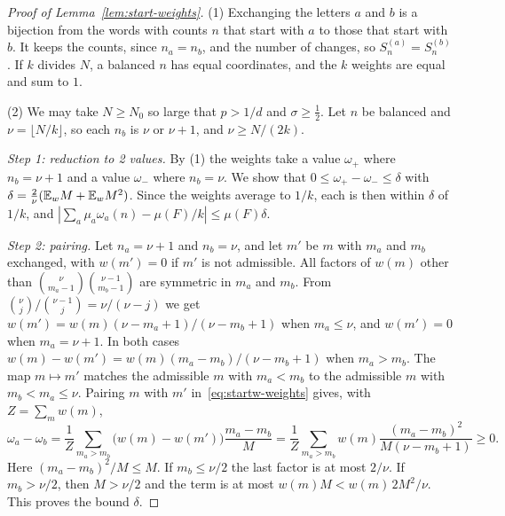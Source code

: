 \begin{proof}[Proof of Lemma~\ref{lem:start-weights}]
(1) Exchanging the letters $a$ and $b$ is a bijection from the words with counts
$n$ that start with $a$ to those that start with $b$. It keeps the counts, since
$n_a=n_b$, and the number of changes, so $S^{(a)}_n=S^{(b)}_n$. If $k$ divides
$N$, a balanced $n$ has equal coordinates, and the $k$ weights are equal and sum
to $1$.

(2) We may take $N\ge N_0$ so large that $p>1/d$ and $\sigma\ge\frac12$. Let $n$
be balanced and $\nu=\lfloor N/k\rfloor$, so each $n_b$ is $\nu$ or $\nu+1$, and
$\nu\ge N/(2k)$.

\emph{Step 1: reduction to 2 values.} By (1) the weights take a value $\omega_+$
where $n_b=\nu+1$ and a value $\omega_-$ where $n_b=\nu$. We show that
$0\le\omega_+-\omega_-\le\delta$ with $\delta=\frac2\nu(\mathbb E_wM+\mathbb E_wM^2)$. Since
the weights average to $1/k$, each is then within $\delta$ of $1/k$, and
$|\sum_a\mu_a\omega_a(n)-\mu(F)/k|\le\mu(F)\delta$.

\emph{Step 2: pairing.} Let $n_a=\nu+1$ and $n_b=\nu$, and let $m'$ be $m$ with
$m_a$ and $m_b$ exchanged, with $w(m')=0$ if $m'$ is not admissible. All factors
of $w(m)$ other than $\binom{\nu}{m_a-1}\binom{\nu-1}{m_b-1}$ are symmetric in
$m_a$ and $m_b$. From $\binom\nu j/\binom{\nu-1}j=\nu/(\nu-j)$ we get
$w(m')=w(m)(\nu-m_a+1)/(\nu-m_b+1)$ when $m_a\le\nu$, and $w(m')=0$ when
$m_a=\nu+1$. In both cases $w(m)-w(m')=w(m)(m_a-m_b)/(\nu-m_b+1)$ when
$m_a>m_b$. The map $m\mapsto m'$ matches the admissible $m$ with $m_a<m_b$ to
the admissible $m$ with $m_b<m_a\le\nu$. Pairing $m$ with $m'$
in~\eqref{eq:startw-weights} gives, with $Z=\sum_mw(m)$,
\[
 \omega_a-\omega_b=\frac1Z\sum_{m_a>m_b}\bigl(w(m)-w(m')\bigr)\frac{m_a-m_b}M
 =\frac1Z\sum_{m_a>m_b}w(m)\frac{(m_a-m_b)^2}{M(\nu-m_b+1)}\ge0.
\]
Here $(m_a-m_b)^2/M\le M$. If $m_b\le\nu/2$ the last factor is at most $2/\nu$. If
$m_b>\nu/2$, then $M>\nu/2$ and the term is at most $w(m)M<w(m)\,2M^2/\nu$. This
proves the bound $\delta$.


\end{proof}
